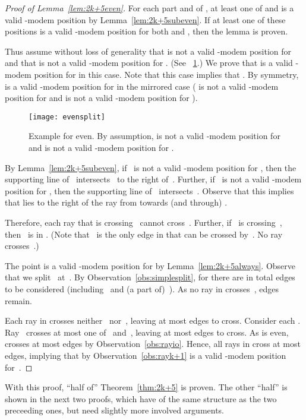 \documentclass[A4]{article}
\begin{document}
\begin{proof}[Proof of Lemma~\ref{lem:2k+5even}]
For each part  and  of , at least one of  and  is a valid \mbox{-modem} position by Lemma~\ref{lem:2k+5subeven}.
If at least one of these positions is a valid \mbox{-modem} position for both  and , then the lemma is proven.

Thus assume without loss of generality that  is not a valid \mbox{-modem} position for  and that  is not a valid \mbox{-modem} position for .
(See \figurename~\ref{fig:evensplit}.) 
We prove that  is a valid \mbox{-modem} position for  in this case.
Note that this case implies that .
By symmetry,  is a valid \mbox{-modem} position for  in the mirrored case ( is not a valid \mbox{-modem} position for  and  is not a valid \mbox{-modem} position for ).

\begin{figure}[htb]
  \centering
  \texttt{[image: evensplit]}
  \caption{Example for  even. By assumption,  is not a valid \mbox{-modem} position for  and  is not a valid \mbox{-modem} position for .}
  \label{fig:evensplit}
\end{figure}

By Lemma~\ref{lem:2k+5subeven}, if~ is not a valid \mbox{-modem} position for , then the supporting line of~ intersects~ to the right of~.
Further, if~ is not a valid \mbox{-modem} position for , then the supporting line of~ intersects~.
Observe that this implies that  lies to the right of the ray from  towards (and through) .


Therefore, each ray  that is crossing~ cannot cross~.
Further, if~ is crossing~, then~ is in .
(Note that~ is the only edge in  that can be crossed by~.
No ray~ crosses~.)


The point  is a valid \mbox{-modem} position for  by Lemma~\ref{lem:2k+5always}.
Observe that we split~ at~.
By Observation~\ref{obs:simplesplit}, for  there are in total  edges to be considered (including~ and (a part of)~).
As no ray in  crosses~,  edges remain.

Each ray in  crosses neither~ nor~, leaving at most  edges to cross.
Consider each .
Ray~ crosses at most one of~ and~, leaving at most  edges to cross.
As  is even,  crosses at most  edges by Observation~\ref{obs:rayio}.
Hence, all rays in  cross at most  edges, implying that by Observation~\ref{obs:rayk+1}  is a valid \mbox{-modem} position for~.
\end{proof}


With this proof, ``half of'' Theorem~\ref{thm:2k+5} is proven.
The other ``half'' is shown in the next two proofs, which have of the same structure as the two preceeding ones, but need slightly more involved arguments.
\end{document}
